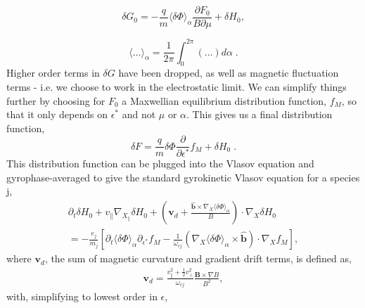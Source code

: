 \documentclass[12pt]{article}
\numberwithin{equation}{subsection}
\begin{document}
   \begin{equation}
      \delta G_0 = -\frac{q}{m}\langle\delta\Phi\rangle_\alpha\frac{\partial F_0}{B\partial\mu} + \delta H_0,
   \end{equation}

   \begin{equation}
      \langle\ldots\rangle_\alpha = \frac{1}{2\pi}\int_{0}^{2\pi}(\ldots)d\alpha\;.
   \end{equation}
Higher order terms in $\delta G$ have been dropped, as well as magnetic fluctuation terms - i.e. we choose to
work in the electrostatic limit. We can simplify things further by choosing for $F_0$ a Maxwellian equilibrium
distribution function, $f_M$, so that it only depends on $\epsilon^*$ and not $\mu$ or $\alpha$. This gives us
a final distribution function,
   \begin{equation}
      \delta F = \frac{q}{m}\delta\Phi\frac{\partial}{\partial\epsilon^*}f_M + \delta H_0\;.
   \end{equation}
This distribution function can be plugged into the Vlasov equation and gyrophase-averaged to give the standard gyrokinetic Vlasov
equation for a species j\cite{FriemanChen},
   \begin{equation}
   \begin{aligned}
        \partial_t\delta H_0 + v_\parallel\nabla_{X_\parallel}\delta H_0 +
        (\bm{v}_d + \frac{\bm{\hat{b}}\times\nabla_X\langle\delta\Phi\rangle_\alpha}{B})\cdot\nabla_X\delta H_0 \\
      = -\frac{e_j}{m_j}[\partial_t\langle\delta\Phi\rangle_\alpha\partial_{\epsilon^*} f_M
        -\frac{1}{\omega_{cj}}(\nabla_X\langle\delta\Phi\rangle_\alpha\times\bm{\hat{b}})\cdot\nabla_X f_M],
   \end{aligned}
   \end{equation}
where $\bm{v}_d$, the sum of magnetic curvature and gradient drift terms, is defined as,
   \begin{equation}
   \begin{aligned}
      \bm{v}_d = \frac{v_\parallel^2 + \frac{1}{2} v_\perp^2}{\omega_{cj}}\frac{\bm{B}\times\nabla B}{B^2},
   \end{aligned}
   \end{equation}
with, simplifying to lowest order in $\epsilon$,
\end{document}
